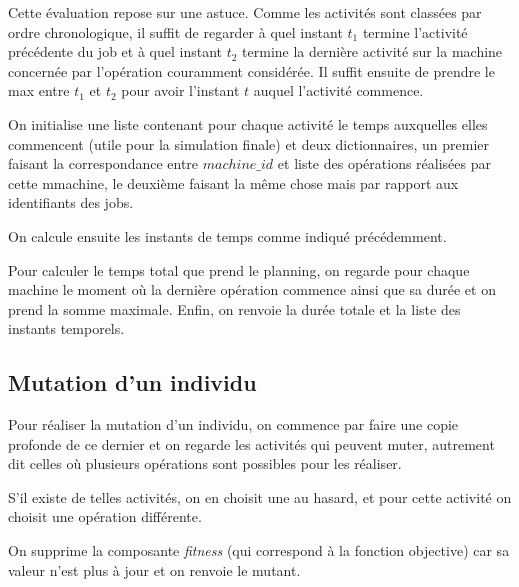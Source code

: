 Cette évaluation repose sur une astuce. Comme les activités sont classées par ordre chronologique, il suffit de regarder à quel instant $t_1$ termine l'activité précédente du job et à quel instant $t_2$ termine la dernière activité sur la machine concernée par l'opération couramment considérée. Il suffit ensuite de prendre le max entre $t_1$ et $t_2$ pour avoir l'instant $t$ auquel l'activité commence.



On initialise une liste contenant pour chaque activité le temps auxquelles elles commencent (utile pour la simulation finale) et deux dictionnaires, un premier faisant la correspondance entre $machine\_id$ et liste des opérations réalisées par cette mmachine, le deuxième faisant la même chose mais par rapport aux identifiants des jobs.



On calcule ensuite les instants de temps comme indiqué précédemment.



Pour calculer le temps total que prend le planning, on regarde pour chaque machine le moment où la dernière opération commence ainsi que sa durée et on prend la somme maximale. Enfin, on renvoie la durée totale et la liste des instants temporels.

\subsection{Mutation d'un individu}



Pour réaliser la mutation d'un individu, on commence par faire une copie profonde de ce dernier et on regarde les activités qui peuvent muter, autrement dit celles où plusieurs opérations sont possibles pour les réaliser.



S'il existe de telles activités, on en choisit une au hasard, et pour cette activité on choisit une opération différente. 



On supprime la composante \textit{fitness} (qui correspond à la fonction objective) car sa valeur n'est plus à jour et on renvoie le mutant.

